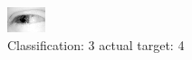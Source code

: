 \begin{figure}[h!]
\begin{center}
\includegraphics[width=0.60\columnwidth]{figures/ID2465_class_3_target_4.png}
\end{center}
\caption{ Classification: 3 actual target: 4}
\label{fig:ID2465_class_3_target_4}
\end{figure}
